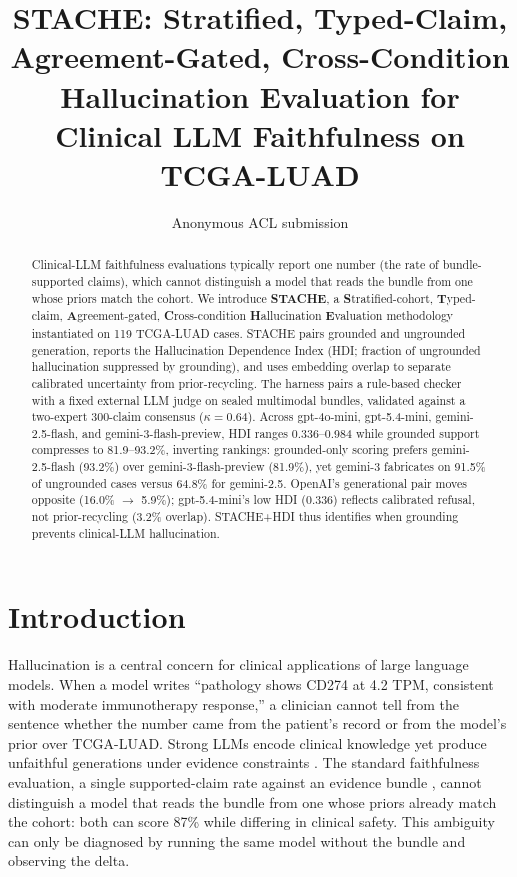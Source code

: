 \documentclass[11pt]{article}
\title{STACHE: Stratified, Typed-Claim, Agreement-Gated, Cross-Condition Hallucination Evaluation for Clinical LLM Faithfulness on TCGA-LUAD}
\author{Anonymous ACL submission}
\begin{document}
\maketitle

\begin{abstract}
Clinical-LLM faithfulness evaluations typically report one number (the rate of bundle-supported claims), which cannot distinguish a model that reads the bundle from one whose priors match the cohort. We introduce \textbf{STACHE}, a \textbf{S}tratified-cohort, \textbf{T}yped-claim, \textbf{A}greement-gated, \textbf{C}ross-condition \textbf{H}allucination \textbf{E}valuation methodology instantiated on 119 TCGA-LUAD cases. STACHE pairs grounded and ungrounded generation, reports the Hallucination Dependence Index (HDI; fraction of ungrounded hallucination suppressed by grounding), and uses embedding overlap to separate calibrated uncertainty from prior-recycling. The harness pairs a rule-based checker with a fixed external LLM judge on sealed multimodal bundles, validated against a two-expert 300-claim consensus ($\kappa=0.64$). Across gpt-4o-mini, gpt-5.4-mini, gemini-2.5-flash, and gemini-3-flash-preview, HDI ranges 0.336--0.984 while grounded support compresses to 81.9--93.2\%, inverting rankings: grounded-only scoring prefers gemini-2.5-flash (93.2\%) over gemini-3-flash-preview (81.9\%), yet gemini-3 fabricates on 91.5\% of ungrounded cases versus 64.8\% for gemini-2.5. OpenAI's generational pair moves opposite (16.0\% $\to$ 5.9\%); gpt-5.4-mini's low HDI (0.336) reflects calibrated refusal, not prior-recycling (3.2\% overlap). STACHE+HDI thus identifies when grounding prevents clinical-LLM hallucination.
\end{abstract}

\section{Introduction}
\label{sec:intro}

Hallucination is a central concern for clinical applications of large language models. When a model writes ``pathology shows CD274 at 4.2 TPM, consistent with moderate immunotherapy response,'' a clinician cannot tell from the sentence whether the number came from the patient's record or from the model's prior over TCGA-LUAD. Strong LLMs encode clinical knowledge \citep{singhal2023largelanguagemodelsencode} yet produce unfaithful generations under evidence constraints \citep{ji2023survey,maynez2020faithfulness,pal2023medhalt}. The standard faithfulness evaluation, a single supported-claim rate against an evidence bundle \citep{deyoung2021ms2,tsatsaronis2015bioasq}, cannot distinguish a model that reads the bundle from one whose priors already match the cohort: both can score 87\% while differing in clinical safety. This ambiguity can only be diagnosed by running the same model without the bundle and observing the delta.
\end{document}

